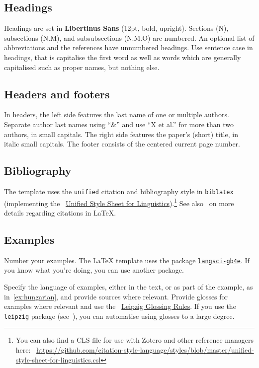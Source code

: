 \subsection{Headings}

Headings are set in \textsf{\textbf{Libertinus Sans}} (12pt, bold, upright).
Sections (N), subsections (N.M), and subsubsections (N.M.O) are numbered. An
optional list of abbreviations and the references have unnumbered headings.
Use sentence case in headings, that is capitalise the first word as well as
words which are generally capitalised such as proper names, but nothing else.

\subsection{Headers and footers}

In headers, the left side features the last name of one or multiple authors.
Separate author last names using \enquote{\&} and use \enquote{X et al.} for
more than two authors, in small capitals. The right side features the paper's
(short) title, in italic small capitals.
%
The footer consists of the centered current page number.

\subsection{Bibliography}

The template uses the \texttt{unified} citation and bibliography style in
\texttt{biblatex} (implementing the
\faExternalLink*{}~\href{https://clas.wayne.edu/linguistics/resources/style}{Unified
    Style Sheet for Linguistics}).\footnote{You can also find a CLS file for use
    with Zotero and other reference managers here:
\faExternalLink*{}~\url{https://github.com/citation-style-language/styles/blob/master/unified-style-sheet-for-linguistics.csl}}
See also~ on more details regarding citations in \LaTeX.

\subsection{Examples}

Number your examples. The \LaTeX{} template uses the package
\faExternalLink*{}
\href{https://ctan.mines-albi.fr/macros/xetex/latex/langsci/documentation/langsci-gb4e.pdf}{\texttt{langsci-gb4e}}.
If you know what you're doing, you can use another package.

Specify the language of examples, either in the text, or as part of the example,
as in~\eqref{ex:hungarian}, and provide sources where relevant. Provide glosses
for examples where relevant and use the
\faExternalLink*{}~\href{https://www.eva.mpg.de/lingua/pdf/Glossing-Rules.pdf}{Leipzig
Glossing Rules}. If you use the \texttt{leipzig} package
(see~), you can automatise using glosses to a large degree.

